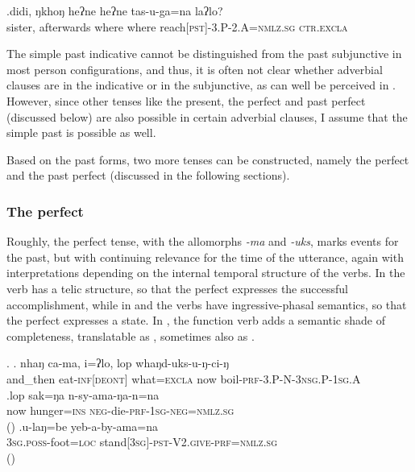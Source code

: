 \exg.didi,        ŋkhoŋ    heʔne heʔne tas-u-ga=na                    laʔlo?\\
sister, afterwards where where reach{\scshape [pst]-3.P-2.A=nmlz.sg} {\scshape ctr.excla}\\
  

The simple past indicative cannot be distinguished from the past subjunctive in most person configurations, and thus, it is often not clear whether adverbial clauses are in the indicative or in the subjunctive, as can well be perceived in \LLast. However, since other tenses like the present, the perfect and past perfect (discussed below) are also possible in certain adverbial clauses, I assume that the simple past is possible as well. 

Based on the past forms, two more tenses can be constructed, namely the perfect and the past perfect (discussed in the following sections). 

\subsubsection{The perfect}\label{prf}

Roughly, the perfect tense, with the allomorphs \emph{-ma} and \emph{-uks}, marks events for the past, but with continuing relevance for  the time of the utterance, again with interpretations depending on the internal temporal structure of the verbs. In \Next[a] the verb has a telic structure, so that the perfect expresses the successful accomplishment, while in \Next[b] and \Next[c] the verbs have ingressive-phasal semantics, so that the perfect expresses a state. In \Next[c], the function verb  adds a semantic shade of completeness, translatable as , sometimes also as .

\ex. \ag. nhaŋ    ca-ma,     i=ʔlo,   lop whaŋd-uks-u-ŋ-ci-ŋ\\
		and\_then eat{\scshape -inf[deont]} what{\scshape =excla} now boil{\scshape -prf-3.P-N-3nsg.P-1sg.A}\\
		 
		\bg.lop sak=ŋa n-sy-ama-ŋa-n=na\\
now hunger{\scshape =ins} {\scshape neg-}die{\scshape -prf-1sg-neg=nmlz.sg}\\
		 ()
	\bg.u-laŋ=be yeb-a-by-ama=na\\
	{\scshape 3sg.poss-}foot{\scshape =loc} stand{\scshape [3sg]-pst-V2.give-prf=nmlz.sg}\\
	 ()
	
